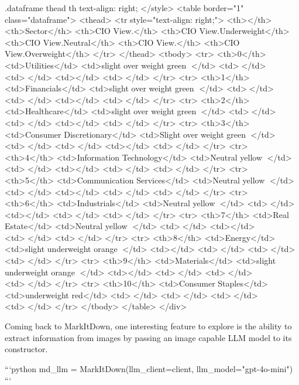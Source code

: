 {{    .dataframe thead th {
        text-align: right;
    }
</style>
<table border="1" class="dataframe">
  <thead>
    <tr style="text-align: right;">
      <th></th>
      <th>Sector</th>
      <th>CIO View.</th>
      <th>CIO View.Underweight</th>
      <th>CIO View.Neutral</th>
      <th>CIO View.</th>
      <th>CIO View.Overweight</th>
    </tr>
  </thead>
  <tbody>
    <tr>
      <th>0</th>
      <td>Utilities</td>
      <td>slight over weight green   </td>
      <td></td>
      <td></td>
      <td></td>
      <td></td>
    </tr>
    <tr>
      <th>1</th>
      <td>Financials</td>
      <td>slight over weight green   </td>
      <td></td>
      <td></td>
      <td></td>
      <td></td>
    </tr>
    <tr>
      <th>2</th>
      <td>Healthcare</td>
      <td>slight over weight green   </td>
      <td></td>
      <td></td>
      <td></td>
      <td></td>
    </tr>
    <tr>
      <th>3</th>
      <td>Consumer  Discretionary</td>
      <td>Slight over weight green  </td>
      <td></td>
      <td></td>
      <td></td>
      <td></td>
    </tr>
    <tr>
      <th>4</th>
      <td>Information  Technology</td>
      <td>Neutral yellow  </td>
      <td></td>
      <td></td>
      <td></td>
      <td></td>
    </tr>
    <tr>
      <th>5</th>
      <td>Communication  Services</td>
      <td>Neutral yellow  </td>
      <td></td>
      <td></td>
      <td></td>
      <td></td>
    </tr>
    <tr>
      <th>6</th>
      <td>Industrials</td>
      <td>Neutral yellow  </td>
      <td></td>
      <td></td>
      <td></td>
      <td></td>
    </tr>
    <tr>
      <th>7</th>
      <td>Real Estate</td>
      <td>Neutral yellow  </td>
      <td></td>
      <td></td>
      <td></td>
      <td></td>
    </tr>
    <tr>
      <th>8</th>
      <td>Energy</td>
      <td>slight underweight orange  </td>
      <td></td>
      <td></td>
      <td></td>
      <td></td>
    </tr>
    <tr>
      <th>9</th>
      <td>Materials</td>
      <td>slight underweight orange  </td>
      <td></td>
      <td></td>
      <td></td>
      <td></td>
    </tr>
    <tr>
      <th>10</th>
      <td>Consumer  Staples</td>
      <td>underweight red</td>
      <td></td>
      <td></td>
      <td></td>
      <td></td>
    </tr>
  </tbody>
</table>
</div>


Coming back to MarkItDown, one interesting feature to explore is the ability to extract information from images by passing an image capable LLM model to its constructor.


```python
md_llm = MarkItDown(llm_client=client, llm_model="gpt-4o-mini")
```


}}
